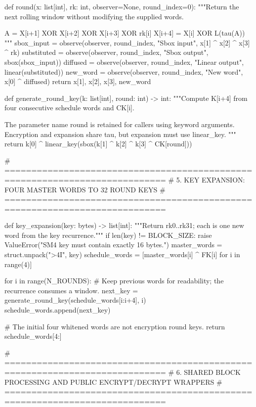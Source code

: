 \begin{lightcode}
def round(x: list[int], rk: int, observer=None, round_index=0):
    """Return the next rolling window without modifying the supplied words.

    A = X[i+1] XOR X[i+2] XOR X[i+3] XOR rk[i]
    X[i+4] = X[i] XOR L(tau(A))
    """
    sbox_input = observe(observer, round_index, "Sbox input", x[1] ^ x[2] ^ x[3] ^ rk)
    substituted = observe(observer, round_index, "Sbox output", sbox(sbox_input))
    diffused = observe(observer, round_index, "Linear output", linear(substituted))
    new_word = observe(observer, round_index, "New word", x[0] ^ diffused)
    return x[1], x[2], x[3], new_word


def generate_round_key(k: list[int], round: int) -> int:
    """Compute K[i+4] from four consecutive schedule words and CK[i].

    The parameter name round is retained for callers using keyword arguments.
    Encryption and expansion share tau, but expansion must use linear_key.
    """
    return k[0] ^ linear_key(sbox(k[1] ^ k[2] ^ k[3] ^ CK[round]))


# ============================================================================
# 5. KEY EXPANSION: FOUR MASTER WORDS TO 32 ROUND KEYS
# ============================================================================


def key_expansion(key: bytes) -> list[int]:
    """Return rk0..rk31; each is one new word from the key recurrence."""
    if len(key) != BLOCK_SIZE:
        raise ValueError("SM4 key must contain exactly 16 bytes.")
    master_words = struct.unpack(">4I", key)
    schedule_words = [master_words[i] ^ FK[i] for i in range(4)]

    for i in range(N_ROUNDS):
        # Keep previous words for readability; the recurrence consumes a window.
        next_key = generate_round_key(schedule_words[i:i+4], i)
        schedule_words.append(next_key)

    # The initial four whitened words are not encryption round keys.
    return schedule_words[4:]


# ============================================================================
# 6. SHARED BLOCK PROCESSING AND PUBLIC ENCRYPT/DECRYPT WRAPPERS
# ============================================================================
\end{lightcode}

